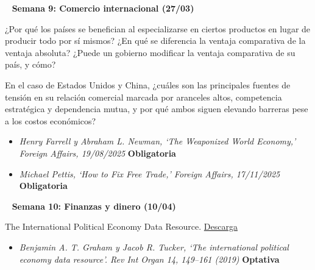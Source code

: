 \documentclass[11pt, a4paper]{article}
\begin{document}
\begin{center} 
\begin{minipage}{6in}
\begin{flushleft}
{\color{darkgreen}{\Rectangle}} ~ \textbf{{\large{Semana 9: Comercio internacional (27/03)}}} \\
\end{flushleft}
¿Por qué los países se benefician al especializarse en ciertos productos en lugar de producir todo por sí mismos? ¿En qué se diferencia la ventaja comparativa de la ventaja absoluta? ¿Puede un gobierno modificar la ventaja comparativa de su país, y cómo? \vspace{0,5em}

En el caso de Estados Unidos y China, ¿cuáles son las principales fuentes de tensión en su relación comercial marcada por aranceles altos, competencia estratégica y dependencia mutua, y por qué ambos siguen elevando barreras pese a los costos económicos?

\begin{itemize}
\item \emph{Henry Farrell y Abraham L. Newman, ‘The Weaponized World Economy,’ Foreign Affairs, 19/08/2025} \textbf{Obligatoria}  

\item \emph{Michael Pettis, ‘How to Fix Free Trade,’ Foreign Affairs, 17/11/2025} \textbf{Obligatoria}   
\end{itemize}
\end{minipage}
\end{center}

\begin{center} 
\begin{minipage}{6in}
\begin{flushleft}
{\color{darkgreen}{\Rectangle}} ~ \textbf{{\large{Semana 10: Finanzas y dinero (10/04)}}} \end{flushleft}

The International Political Economy Data Resource. \href{https://dataverse.harvard.edu/dataset.xhtml?persistentId=doi:10.7910/DVN/X093TV}{Descarga}

\begin{itemize}

\item \emph{Benjamin A. T. Graham y Jacob R. Tucker, ‘The international political economy data resource’. Rev Int Organ 14, 149–161 (2019)} \textbf{Optativa}  

\end{itemize}
\end{minipage}
\end{center}
\end{document}
